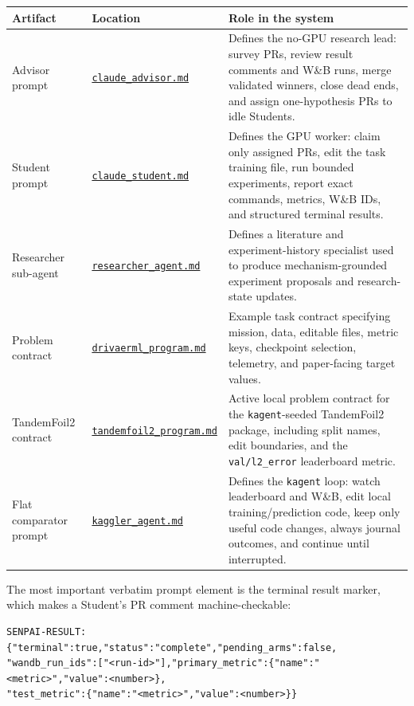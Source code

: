 \documentclass{article}
\newcommand{\appendixsourcelink}[1]{\href{https://github.com/wandb/senpai/blob/main/papers/appendix_sources/#1}{\nolinkurl{#1}}}
\begin{document}
\begin{center}
  \label{tab:instruction-source-map}
  \small
  \begin{tabular}{@{}p{}p{}p{}@{}}
    \toprule
    Artifact & Location & Role in the system \\
    \midrule
    Advisor prompt & \appendixsourcelink{claude_advisor.md} & Defines the no-GPU research lead: survey PRs, review result comments and W\&B runs, merge validated winners, close dead ends, and assign one-hypothesis PRs to idle Students. \\
    Student prompt & \appendixsourcelink{claude_student.md} & Defines the GPU worker: claim only assigned PRs, edit the task training file, run bounded experiments, report exact commands, metrics, W\&B IDs, and structured terminal results. \\
    Researcher sub-agent & \appendixsourcelink{researcher_agent.md} & Defines a literature and experiment-history specialist used to produce mechanism-grounded experiment proposals and research-state updates. \\
    Problem contract & \appendixsourcelink{drivaerml_program.md} & Example task contract specifying mission, data, editable files, metric keys, checkpoint selection, telemetry, and paper-facing target values. \\
    TandemFoil2 contract & \appendixsourcelink{tandemfoil2_program.md} & Active local problem contract for the \texttt{kagent}-seeded TandemFoil2 package, including split names, edit boundaries, and the \texttt{val/l2\_error} leaderboard metric. \\
    Flat comparator prompt & \appendixsourcelink{kaggler_agent.md} & Defines the \texttt{kagent} loop: watch leaderboard and W\&B, edit local training/prediction code, keep only useful code changes, always journal outcomes, and continue until interrupted. \\
    \bottomrule
  \end{tabular}
\end{center}

The most important verbatim prompt element is the terminal result marker, which makes a Student's PR comment machine-checkable:

{\small
\begin{verbatim}
SENPAI-RESULT: {"terminal":true,"status":"complete","pending_arms":false,
"wandb_run_ids":["<run-id>"],"primary_metric":{"name":"<metric>","value":<number>},
"test_metric":{"name":"<metric>","value":<number>}}
\end{verbatim}
}
\end{document}
